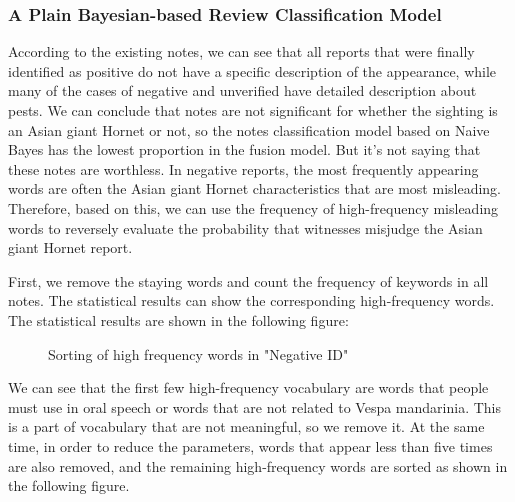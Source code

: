 \documentclass{mcmthesis}
\numberwithin{figure}{section}
\numberwithin{table}{section}
\begin{document}
\subsubsection{A Plain Bayesian-based Review Classification Model}
According to the existing notes, we can see that all reports that were finally identified as positive do not have a specific description of the appearance, while many of the cases of negative and unverified have detailed description about pests. We can conclude that notes are not significant for whether the sighting is an Asian giant Hornet or not, so the notes classification model based on Naive Bayes has the lowest proportion in the fusion model. But it's not saying that these notes are worthless. In negative reports, the most frequently appearing words are often the Asian giant Hornet characteristics that are most misleading. Therefore, based on this, we can use the frequency of high-frequency misleading words to reversely evaluate the probability that witnesses misjudge the Asian giant Hornet report.

First, we remove the staying words and count the frequency of keywords in all notes. The statistical results can show the corresponding high-frequency words. The statistical results are shown in the following figure:

\begin{figure}[H]
  \caption{Sorting of high frequency words in "Negative ID"}\label{sohfw}
\end{figure}

We can see that the first few high-frequency vocabulary are words that people must use in oral speech or words that are not related to Vespa mandarinia. This is a part of vocabulary that are not meaningful, so we remove it. At the same time, in order to reduce the parameters, words that appear less than five times are also removed, and the remaining high-frequency words are sorted as shown in the following figure.
\end{document}
